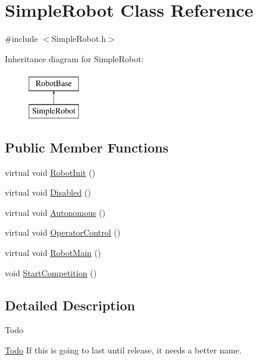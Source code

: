 \hypertarget{classSimpleRobot}{\section{\-Simple\-Robot \-Class \-Reference}
\label{classSimpleRobot}
}


{\ttfamily \#include $<$\-Simple\-Robot.\-h$>$}

\-Inheritance diagram for \-Simple\-Robot\-:\begin{figure}[H]
\begin{center}
\leavevmode
\includegraphics[height=2.000000cm]{classSimpleRobot}
\end{center}
\end{figure}
\subsection*{\-Public \-Member \-Functions}
\begin{DoxyCompactItemize}
\item 
virtual void \hyperlink{classSimpleRobot_a36d930afdef1b1e13a93809e96bbde37}{\-Robot\-Init} ()
\item 
virtual void \hyperlink{classSimpleRobot_a93dcecf966462b2c74c879d97c8a7efd}{\-Disabled} ()
\item 
virtual void \hyperlink{classSimpleRobot_adc17c3196fe3f8250b42a54fb126585e}{\-Autonomous} ()
\item 
virtual void \hyperlink{classSimpleRobot_ab9bccb38aafefa41352afe10a22ab4a8}{\-Operator\-Control} ()
\item 
virtual void \hyperlink{classSimpleRobot_a19913a6ef4026f8a528eeb18e73d1886}{\-Robot\-Main} ()
\item 
void \hyperlink{classSimpleRobot_ae8a0924c156c64ecee70101e1e17e7b2}{\-Start\-Competition} ()
\end{DoxyCompactItemize}


\subsection{\-Detailed \-Description}
\begin{DoxyRefDesc}{\-Todo}
\item[\hyperlink{todo__todo000004}{\-Todo}]\-If this is going to last until release, it needs a better name. \end{DoxyRefDesc}


